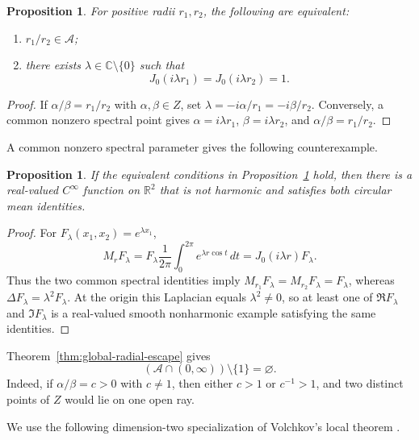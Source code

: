 \documentclass[11pt]{amsart}
\numberwithin{equation}{section}
\newtheorem{proposition}[theorem]{Proposition}
\theoremstyle{definition}
\theoremstyle{remark}
\newcommand{\C}{\mathbb C}
\newcommand{\R}{\mathbb R}
\begin{document}
\begin{proposition}\label{prop:spectral-equivalence}
For positive radii $r_1,r_2$, the following are equivalent:
\begin{enumerate}
\item $r_1/r_2\in\mathcal A$;
\item there exists $\lambda\in\C\setminus\{0\}$ such that
\[
   J_0(i\lambda r_1)=J_0(i\lambda r_2)=1.
\]
\end{enumerate}
\end{proposition}

\begin{proof}
If $\alpha/\beta=r_1/r_2$ with $\alpha,\beta\in Z$, set
$\lambda=-i\alpha/r_1=-i\beta/r_2$.  Conversely, a common nonzero spectral
point gives $\alpha=i\lambda r_1$, $\beta=i\lambda r_2$, and
$\alpha/\beta=r_1/r_2$.
\end{proof}

A common nonzero spectral parameter gives the following counterexample.

\begin{proposition}\label{prop:explicit-counterexample}
If the equivalent conditions in Proposition~\ref{prop:spectral-equivalence}
hold, then there is a real-valued $C^\infty$ function on $\R^2$ that is not
harmonic and satisfies both circular mean identities.
\end{proposition}

\begin{proof}
For $F_\lambda(x_1,x_2)=e^{\lambda x_1}$,
\[
   M_rF_\lambda
   =F_\lambda\frac1{2\pi}\int_0^{2\pi}e^{\lambda r\cos t}\,dt
   =J_0(i\lambda r)F_\lambda.
\]
Thus the two common spectral identities imply
$M_{r_1}F_\lambda=M_{r_2}F_\lambda=F_\lambda$, whereas
$\Delta F_\lambda=\lambda^2F_\lambda$.  At the origin this Laplacian equals
$\lambda^2\ne0$, so at least one of $\Re F_\lambda$ and $\Im F_\lambda$
is a real-valued smooth nonharmonic example satisfying the same identities.
\end{proof}

Theorem~\ref{thm:global-radial-escape} gives
\begin{equation}\label{eq:positive-ratio-removal}
   (\mathcal A\cap(0,\infty))\setminus\{1\}=\varnothing.
\end{equation}
Indeed, if $\alpha/\beta=c>0$ with $c\ne1$, then either $c>1$ or
$c^{-1}>1$, and two distinct points of $Z$ would lie on one open ray.

We use the following dimension-two specialization of Volchkov's local
theorem \cite[Theorem~1(i)]{Volchkov1996}.
\end{document}
